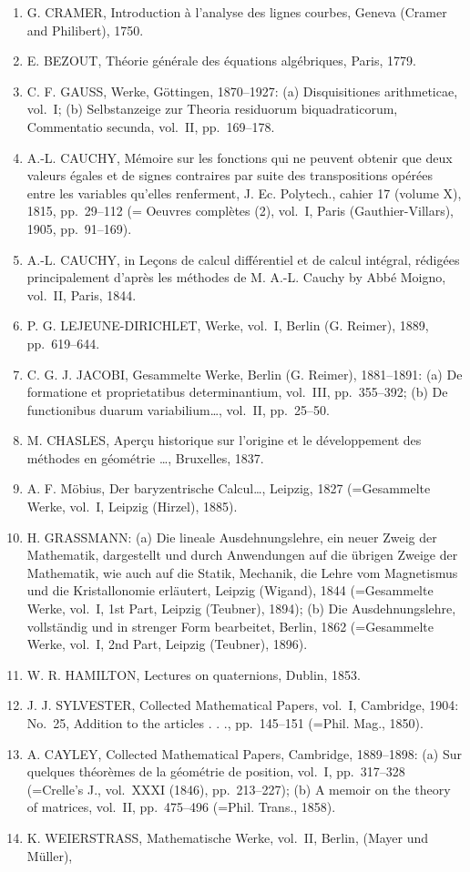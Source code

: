 \begin{enumerate}
\def\labelenumi{\arabic{enumi}.}
\setcounter{enumi}{9}
\item
  G. CRAMER, Introduction à l'analyse des lignes courbes, Geneva (Cramer and Philibert), 1750.
\item
  E. BEZOUT, Théorie générale des équations algébriques, Paris, 1779.
\item
  C. F. GAUSS, Werke, Göttingen, 1870--1927: (a) Disquisitiones arithmeticae, vol.~I; (b) Selbstanzeige zur Theoria residuorum biquadraticorum, Commentatio secunda, vol.~II, pp.~169--178.
\item
  A.-L. CAUCHY, Mémoire sur les fonctions qui ne peuvent obtenir que deux valeurs égales et de signes contraires par suite des transpositions opérées entre les variables qu'elles renferment, J. Ec. Polytech., cahier 17 (volume X), 1815, pp.~29--112 (= Oeuvres complètes (2), vol.~I, Paris (Gauthier-Villars), 1905, pp.~91--169).
\item
  A.-L. CAUCHY, in Leçons de calcul différentiel et de calcul intégral, rédigées principalement d'après les méthodes de M. A.-L. Cauchy by Abbé Moigno, vol.~II, Paris, 1844.
\item
  P. G. LEJEUNE-DIRICHLET, Werke, vol.~I, Berlin (G. Reimer), 1889, pp.~619--644.
\item
  C. G. J. JACOBI, Gesammelte Werke, Berlin (G. Reimer), 1881--1891: (a) De formatione et proprietatibus determinantium, vol.~III, pp.~355--392; (b) De functionibus duarum variabilium\ldots, vol.~II, pp.~25--50.
\item
  M. CHASLES, Aperçu historique sur l'origine et le développement des méthodes en géométrie \ldots, Bruxelles, 1837.
\item
  A. F. Möbius, Der baryzentrische Calcul\ldots, Leipzig, 1827 (=Gesammelte Werke, vol.~I, Leipzig (Hirzel), 1885).
\item
  H. GRASSMANN: (a) Die lineale Ausdehnungslehre, ein neuer Zweig der Mathematik, dargestellt und durch Anwendungen auf die übrigen Zweige der Mathematik, wie auch auf die Statik, Mechanik, die Lehre vom Magnetismus und die Kristallonomie erläutert, Leipzig (Wigand), 1844 (=Gesammelte Werke, vol.~I, 1st Part, Leipzig (Teubner), 1894); (b) Die Ausdehnungslehre, vollständig und in strenger Form bearbeitet, Berlin, 1862 (=Gesammelte Werke, vol.~I, 2nd Part, Leipzig (Teubner), 1896).
\item
  W. R. HAMILTON, Lectures on quaternions, Dublin, 1853.
\item
  J. J. SYLVESTER, Collected Mathematical Papers, vol.~I, Cambridge, 1904: No.~25, Addition to the articles . . ., pp.~145--151 (=Phil. Mag., 1850).
\item
  A. CAYLEY, Collected Mathematical Papers, Cambridge, 1889--1898: (a) Sur quelques théorèmes de la géométrie de position, vol.~I, pp.~317--328 (=Crelle's J., vol.~XXXI (1846), pp.~213--227); (b) A memoir on the theory of matrices, vol.~II, pp.~475--496 (=Phil. Trans., 1858).
\item
  K. WEIERSTRASS, Mathematische Werke, vol.~II, Berlin, (Mayer und Müller),
\end{enumerate}

